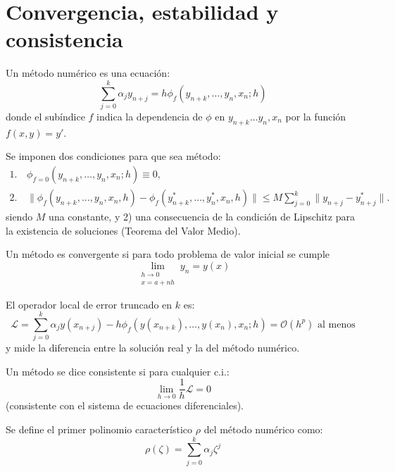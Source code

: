 \section{Convergencia, estabilidad y consistencia}

\begin{defi}
    Un método numérico es una ecuación:
\begin{equation*}
    \sum_{j=0}^k \alpha_j y_{n+j} = h \phi_f(y_{n+k}, \dots, y_n, x_n; h) \tag{2.4}
\end{equation*}
donde el subíndice $f$ indica la dependencia de $\phi$ en $y_{n+k} \dots y_n, x_n$ por la función $f(x,y) = y'$.

Se imponen dos condiciones para que sea método:
\begin{equation*}
\begin{aligned}
1. & \, \phi_{f=0}(y_{n+k}, \dots, y_n, x_n; h) \equiv 0, \\
2. & \, \displaystyle \|\phi_f(y_{n+k}, \dots, y_n, x_n, h) - \phi_f(y^*_{n+k}, \dots, y^*_n, x_n, h)\| \le M \sum_{j=0}^k \|y_{n+j} - y^*_{n+j}\|.
\end{aligned}
\tag{2.5}
\end{equation*}
 siendo $M$ una constante, y 2) una consecuencia de la condición de Lipschitz para la existencia de soluciones (Teorema del Valor Medio).
\end{defi} 

\begin{defi}
    Un método es convergente si para todo problema de valor inicial se cumple
$$ \lim_{\substack{h \to 0 \\ x = a+nh}} y_n = y(x) $$
\end{defi} 

\begin{defi}
    El operador local de error truncado en $k$ es:
$$ \mathscr L = \sum_{j=0}^k \alpha_j y(x_{n+j}) - h \phi_f(y(x_{n+k}), \dots, y(x_n), x_n; h) = \mathcal{O}(h^p) \text{ al menos} $$
y mide la diferencia entre la solución real y la del método numérico.
\end{defi}

\begin{defi}
    Un método se dice consistente si para cualquier c.i.:
$$ \lim_{h \to 0} \frac{1}{h}\mathscr L = 0 $$
(consistente con el sistema de ecuaciones diferenciales).
\end{defi}

\begin{defi}
    Se define el primer polinomio caracter\'istico $\rho$ del método numérico como:
$$ \rho(\zeta) = \sum_{j=0}^k \alpha_j \zeta^j $$
\end{defi} 

